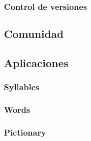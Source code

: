 \subsubsection{Control de versiones}
\label{sub:control_de_versiones}


\subsection{Comunidad}
\label{sec:comunidad}


\subsection{Aplicaciones}
\label{sec:aplicaciones}

\subsubsection{Syllables}
\label{sub:syllables}

\subsubsection{Words}
\label{sub:words}

\subsubsection{Pictionary}
\label{sub:pictionary}

